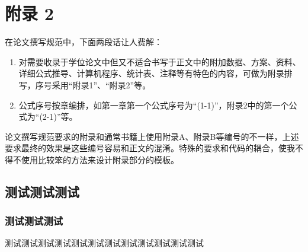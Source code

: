 \setcounter{chapter}{2} %
\setcounter{section}{0}
\setcounter{equation}{0}
\setcounter{table}{0}   
\setcounter{figure}{0}
\chapter{附\texorpdfstring{\quad}{}录 2} %

在论文撰写规范中，下面两段话让人费解：

\begin{enumerate}
	\item 	对需要收录于学位论文中但又不适合书写于正文中的附加数据、方案、资料、详细公式推导、计算机程序、统计表、注释等有特色的内容，可做为附录排写，序号采用“附录1”、“附录2”等。	
	\item	公式序号按章编排，如第一章第一个公式序号为“(1-1)”，附录2中的第一个公式为“(2-1)”等。
\end{enumerate}

论文撰写规范要求的附录和通常书籍上使用附录A、附录B等编号的不一样，上述要求最终的效果是这些编号容易和正文的混淆。特殊的要求和代码的耦合，使我不得不使用比较笨的方法来设计附录部分的模板。

\section{测试测试测试}
\subsection{测试测试测试}
%
测试测试测试测试测试测试测试测试测试测试测试测试

